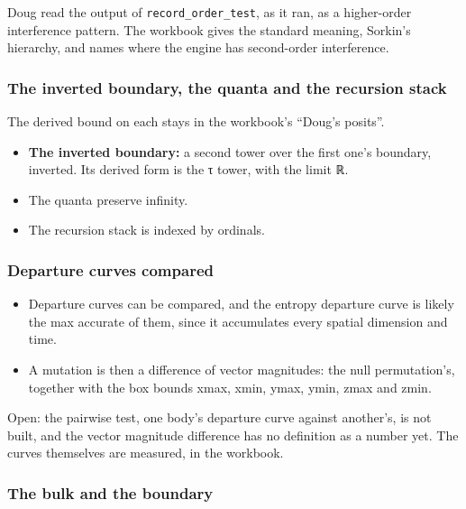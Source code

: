 Doug read the output of \texttt{record\_\allowbreak{}order\_\allowbreak{}test}, as it ran, as a higher-order interference pattern. The workbook gives the standard meaning, Sorkin's hierarchy, and names where the engine has second-order interference.

\subsubsection{\texorpdfstring{The inverted boundary, the quanta and the recursion stack}{The inverted boundary, the quanta and the recursion stack}}

The derived bound on each stays in the workbook's “Doug's posits”.

\begin{itemize}
\item \textbf{The inverted boundary:} a second tower over the first one's boundary, inverted. Its derived form is the τ tower, with the limit ℝ.
\item The quanta preserve infinity.
\item The recursion stack is indexed by ordinals.
\end{itemize}

\subsubsection{\texorpdfstring{Departure curves compared}{Departure curves compared}}

\begin{itemize}
\item Departure curves can be compared, and the entropy departure curve is likely the max accurate of them, since it accumulates every spatial dimension and time.
\item A mutation is then a difference of vector magnitudes: the null permutation's, together with the box bounds xmax, xmin, ymax, ymin, zmax and zmin.
\end{itemize}

Open: the pairwise test, one body's departure curve against another's, is not built, and the vector magnitude difference has no definition as a number yet. The curves themselves are measured, in the workbook.

\subsubsection{\texorpdfstring{The bulk and the boundary}{The bulk and the boundary}}

